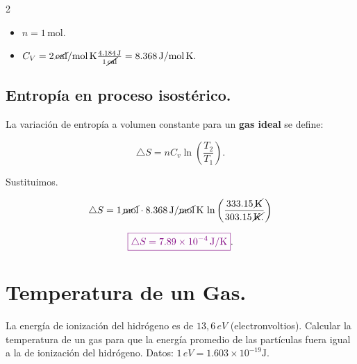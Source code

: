 \documentclass[a4paper,12pt]{article} %
\begin{document}
\begin{multicols}{2}
    \begin{itemize}
        \item \( n = 1 \, \mathrm{mol}. \)
        \item \( C_V = 2 \, \cancel{\mathrm{cal}} / \mathrm{mol} \, \mathrm{K} \frac{4.184 \, \mathrm{J}}{1 \, \cancel{\mathrm{cal}}} = 8.368 \, \mathrm{J} / \mathrm{mol} \, \mathrm{K}. \)
    \end{itemize}
\end{multicols}

\vspace{\baselineskip}

\subsection{Entropía en proceso isostérico.}

\begin{justify}
    La variación de entropía a volumen constante para un \textbf{gas ideal} se define:
\end{justify}

\[ \triangle S = nC_v \ln \left( \frac{T_2}{T_1} \right). \]

\vspace{\baselineskip}

\begin{justify}
    Sustituimos.
\end{justify}

\[ \triangle S = 1 \, \cancel{\mathrm{mol}} \cdot 8.368 \, \mathrm{J}/ \cancel{\mathrm{mol}} \, \mathrm{K} \, \ln \left( \frac{333.15 \, \cancel{\mathrm{K}}}{303.15 \, \cancel{\mathrm{K}.}} \right) \]

\vspace{\baselineskip}

\[ \textcolor{violet}{\boxed{ \triangle S = 7.89 \times 10^{-4} \, \mathrm{J}/\mathrm{K} }}. \]

\vspace{\baselineskip}

\section{Temperatura de un Gas.}

\begin{justify}
    La energía de ionización del hidrógeno es de \( 13,6 \, eV \) (electronvoltios). Calcular la temperatura de un gas para que la energía promedio de las partículas fuera igual a la de ionización del hidrógeno. Datos: \( 1 \, eV= 1.603 \times 10^{-19} \mathrm{J}. \)
\end{justify}
\end{document}

